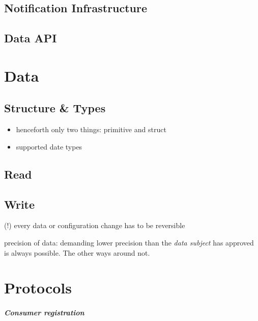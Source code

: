 \documentclass[12pt,english,a4paper,titlepage,cleardoublepage=empty,dottedtoc]{report}
\providecommand{\tightlist}{%
  \setlength{\itemsep}{0pt}\setlength{\parskip}{0pt}}
\begin{document}
\subsection{Notification
Infrastructure}\label{notification-infrastructure}

\subsection{Data API}\label{data-api}

\section{Data}\label{data-1}

\subsection{Structure \& Types}\label{structure-types}

\begin{itemize}
\tightlist
\item
  henceforth only two things: primitive and struct
\item
  supported date types
\end{itemize}

\subsection{Read}\label{read}

\subsection{Write}\label{write}

(!) every data or configuration change has to be reversible

precision of data: demanding lower precision than the \emph{data
subject} has approved is always possible. The other ways around not.

\section{Protocols}\label{protocols}

\subparagraph{Consumer registration}\label{consumer-registration}
\end{document}
